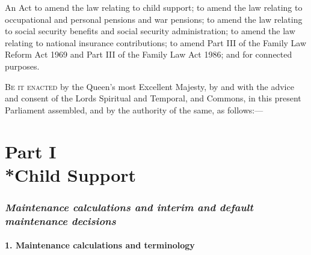 \documentclass[12pt,a4paper]{article}
\title{\regstitle}
\author{2000 Chapter 19}
\date{Royal Assent
28th July 2000\\
}
\begin{document}
\maketitle

{\noindent\large
An Act to amend the law relating to child support; to amend the law relating to occupational and personal pensions and war pensions; to amend the law relating to social security benefits and social security administration; to amend the law relating to national insurance contributions; to amend Part III of the Family Law Reform Act 1969 and Part III of the Family Law Act 1986; and for connected purposes.

}

\bigskip

\lettrine{B}{e it enacted} by the Queen’s most Excellent Majesty, by and with the advice and consent of the Lords Spiritual and Temporal, and Commons, in this present Parliament assembled, and by the authority of the same, as follows:—  

\enlargethispage{\baselineskip}

{\sloppy

\tableofcontents

}

\bigskip

\setcounter{secnumdepth}{-2}

\part[Part I --- Child Support]{Part I\\*Child Support}

\renewcommand\parthead{--- Part I}

\section[\itshape Maintenance calculations and interim and default maintenance decisions]{\itshape\sloppy Maintenance calculations and interim and default maintenance decisions}

\subsection[1. Maintenance calculations and terminology]{1. Maintenance calculations and terminology}
\end{document}
